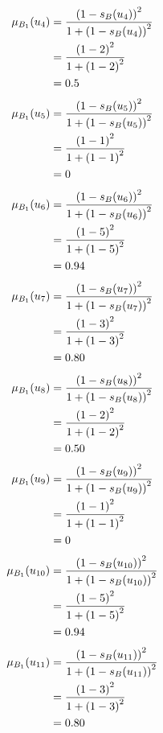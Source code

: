\documentclass[a4paper]{book}
\begin{document}
				\begin{align}
					\mu_{B_1}(u_4) &= \frac{\left(1-s_B(u_4)\right)^2}{1 + \left(1-s_B(u_4)\right)^2}\\
					&= \frac{\left(1-2\right)^2}{1 + \left(1-2\right)^2} \notag \\
					&= 0.5 \notag
				\end{align}
				\begin{align}
					\mu_{B_1}(u_5) &= \frac{\left(1-s_B(u_5)\right)^2}{1 + \left(1-s_B(u_5)\right)^2}\\
					&= \frac{\left(1-1\right)^2}{1 + \left(1-1\right)^2} \notag \\
					&= 0 \notag
				\end{align}
				\begin{align}
					\mu_{B_1}(u_6) &= \frac{\left(1-s_B(u_6)\right)^2}{1 + \left(1-s_B(u_6)\right)^2}\\
					&= \frac{\left(1-5\right)^2}{1 + \left(1-5\right)^2} \notag \\
					&= 0.94 \notag
				\end{align}
				\begin{align}
					\mu_{B_1}(u_7) &= \frac{\left(1-s_B(u_7)\right)^2}{1 + \left(1-s_B(u_7)\right)^2}\\
					&= \frac{\left(1-3\right)^2}{1 + \left(1-3\right)^2} \notag \\
					&= 0.80 \notag
				\end{align}
				\begin{align}
					\mu_{B_1}(u_8) &= \frac{\left(1-s_B(u_8)\right)^2}{1 + \left(1-s_B(u_8)\right)^2}\\
					&= \frac{\left(1-2\right)^2}{1 + \left(1-2\right)^2} \notag \\
					&= 0.50 \notag
				\end{align}
				\begin{align}
					\mu_{B_1}(u_9) &= \frac{\left(1-s_B(u_9)\right)^2}{1 + \left(1-s_B(u_9)\right)^2}\\
					&= \frac{\left(1-1\right)^2}{1 + \left(1-1\right)^2} \notag \\
					&= 0 \notag
				\end{align}
				\begin{align}
					\mu_{B_1}(u_{10}) &= \frac{\left(1-s_B(u_{10})\right)^2}{1 + \left(1-s_B(u_{10})\right)^2}\\
					&= \frac{\left(1-5\right)^2}{1 + \left(1-5\right)^2} \notag \\
					&= 0.94 \notag
				\end{align}
				\begin{align}
					\mu_{B_1}(u_{11}) &= \frac{\left(1-s_B(u_{11})\right)^2}{1 + \left(1-s_B(u_{11})\right)^2}\\
					&= \frac{\left(1-3\right)^2}{1 + \left(1-3\right)^2} \notag \\
					&= 0.80 \notag
				\end{align}
\end{document}
